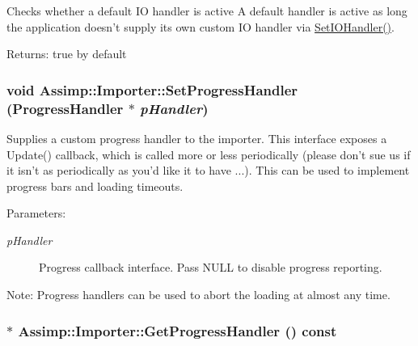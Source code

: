 Checks whether a default IO handler is active A default handler is active as long the application doesn't supply its own custom IO handler via \hyperlink{class_assimp_1_1_importer_1161f46318af18bb86dfe0fc3edea4df}{SetIOHandler()}. \begin{Desc}
\item[Returns:]true by default \end{Desc}
\hypertarget{class_assimp_1_1_importer_6a4d830ffb3f77a3c7c919e0af006920}{
\subsubsection[SetProgressHandler]{\setlength{\rightskip}{0pt plus 5cm}void Assimp::Importer::SetProgressHandler ({\bf ProgressHandler} $\ast$ {\em pHandler})}}
\label{class_assimp_1_1_importer_6a4d830ffb3f77a3c7c919e0af006920}


Supplies a custom progress handler to the importer. This interface exposes a Update() callback, which is called more or less periodically (please don't sue us if it isn't as periodically as you'd like it to have ...). This can be used to implement progress bars and loading timeouts. \begin{Desc}
\item[Parameters:]
\begin{description}
\item[{\em pHandler}]Progress callback interface. Pass NULL to disable progress reporting. \end{description}
\end{Desc}
\begin{Desc}
\item[Note:]Progress handlers can be used to abort the loading at almost any time. \end{Desc}
\hypertarget{class_assimp_1_1_importer_1fa669f0edc504fdf9178e8e22c728ad}{
\subsubsection[GetProgressHandler]{$\ast$ Assimp::Importer::GetProgressHandler () const}}
\label{class_assimp_1_1_importer_1fa669f0edc504fdf9178e8e22c728ad}


